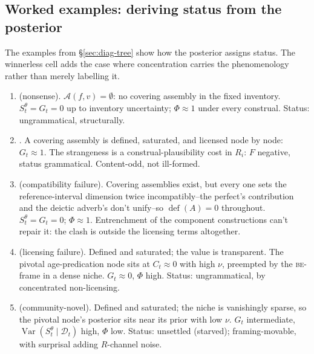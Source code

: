 \subsection{Worked examples: deriving status from the posterior}
\label{sec:worked-examples}

The examples from \S\ref{sec:diag-tree} show how the posterior assigns status.
The winnerless cell adds the case where concentration carries the phenomenology
rather than merely labelling it.

\begin{enumerate}
\item {} (nonsense).
  $\mathcal{A}(f,v)=\emptyset$: no covering assembly in the fixed inventory.
  $S_t^{\theta}=G_t=0$ up to inventory uncertainty; $\Phi\approx1$ under every
  construal. Status: ungrammatical, structurally.

\item {}. A covering assembly is defined, saturated, and licensed node by node: $G_t\approx1$. The strangeness is a construal-plausibility cost in $R_i$: $F$ negative, status grammatical. Content-odd, not ill-formed.

\item {} (compatibility failure). Covering assemblies exist, but every one sets the reference-interval dimension twice incompatibly--the perfect's contribution and the deictic adverb's don't unify--so $\operatorname{def}(A)=0$ throughout. $S_t^{\theta}=G_t=0$; $\Phi\approx1$. Entrenchment of the component constructions can't repair it: the clash is outside the licensing terms altogether.

\item {} (licensing failure). Defined and saturated; the value is transparent. The pivotal age-predication node sits at $C_t\approx0$ with high $\nu$, preempted by the \textsc{be}-frame in a dense niche. $G_t\approx0$, $\Phi$ high. Status: ungrammatical, by concentrated non-licensing.

\item {} (community-novel). Defined and saturated; the niche is vanishingly sparse, so the pivotal node's posterior sits near its prior with low $\nu$. $G_t$ intermediate, $\operatorname{Var}(S_t^{\theta}\mid\mathcal{D}_t)$ high, $\Phi$ low. Status: unsettled (starved); framing-movable, with surprisal adding $R$-channel noise.


\end{enumerate}
